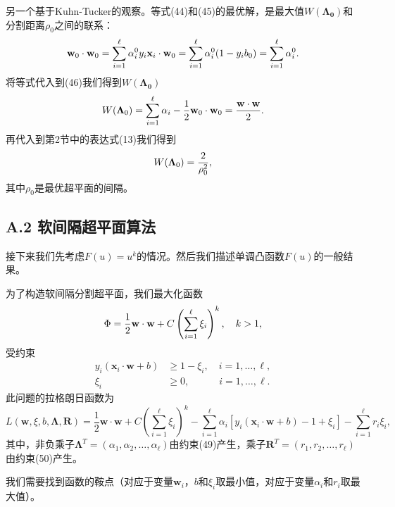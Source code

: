 \documentclass[lang=cn,11pt,a4paper]{elegantpaper}
\begin{document}
	另一个基于Kuhn-Tucker的观察。等式(44)和(45)的最优解，是最大值$W(\mathbf{\Lambda_0})$和分割距离$\rho_0$之间的联系：
	\begin{equation}
		\mathbf{w}_0\cdot\mathbf{w}_0=\sum_{i=1}^{\ell}\alpha_i^0y_i\mathbf{x}_i\cdot\mathbf{w}_0=\sum_{i=1}^\ell\alpha_i^0(1-y_ib_0)=\sum_{i=1}^\ell\alpha_i^0.\notag
	\end{equation}
	将等式代入到(46)我们得到$W(\mathbf{\Lambda_0})$
	\begin{equation}
		W(\mathbf{\Lambda}_0) = \sum_{i=1}^{\ell} \alpha_i - \frac{1}{2} \mathbf{w}_0 \cdot \mathbf{w}_0 = \frac{\mathbf{w}\cdot\mathbf{w}}{2}.\notag
	\end{equation}
	再代入到第2节中的表达式(13)我们得到
	\begin{equation}
		W(\mathbf{\Lambda}_0)=\frac{2}{\rho_0^2},\notag
	\end{equation}
	其中$\rho_0$是最优超平面的间隔。

	\subsection*{A.2 软间隔超平面算法}
	接下来我们先考虑$F(u)=u^k$的情况。然后我们描述单调凸函数$F(u)$的一般结果。

	为了构造软间隔分割超平面，我们最大化函数
	\begin{equation}
		\Phi=\frac{1}{2}\mathbf{w}\cdot\mathbf{w}+C\left(\sum_{i=1}^{\ell}\xi_i\right)^k,\quad k>1,\notag
	\end{equation}
	受约束
	\begin{align}
		y_i(\mathbf{x}_i\cdot\mathbf{w}+b)&\geq1-\xi_i,\quad  i=1,\dots,\ell, \tag{49} \\
		\xi_i&\geq0,\qquad \quad i=1,\dots,\ell. \tag{50}
	\end{align}
	此问题的拉格朗日函数为
	\begin{equation}
		L(\mathbf{w},\xi,b,\mathbf{\Lambda},\mathbf{R})=\frac{1}{2}\mathbf{w}\cdot\mathbf{w}+C\left(\sum_{i=1}^\ell\xi_i\right)^k-\sum_{i=1}^\ell\alpha_i[y_i(\mathbf{x}_i\cdot\mathbf{w}+b)-1+\xi_i]-\sum_{i=1}^\ell r_i\xi_i,\tag{51}
	\end{equation}
	其中，非负乘子$\mathbf{\Lambda}^T=(\alpha_1,\alpha_2,\dots,\alpha_\ell)$由约束(49)产生，乘子$\mathbf{R}^T=(r_1,r_2,\dots,r_\ell)$由约束(50)产生。

	我们需要找到函数的鞍点（对应于变量$\mathbf{w}_i$，$b$和$\xi_i$取最小值，对应于变量$\alpha_i$和$r_i$取最大值）。
\end{document}
